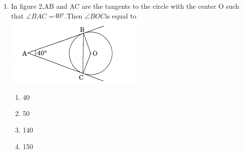 \documentclass[journal,12pt,twocolumn]{IEEEtran}
\renewcommand\thesection{\arabic{section}}
\begin{document}
\begin{enumerate}[label=\thesection.\arabic*.,ref=\thesection.\theenumi]
%
\item In figure 2,AB and AC are the tangents to the circle with the center O such that $\angle BAC$ =$40\degree$.Then $\angle BOC $is equal to
\includegraphics[width=\columnwidth]{4.png}
\begin{enumerate}
    \item 40\degree
    \item 50\degree
    \item 140\degree
    \item 150\degree
\end{enumerate}

\end{enumerate}
\end{document}
